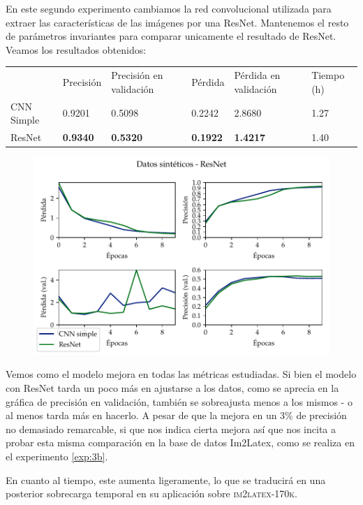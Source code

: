 \documentclass[a4paper, 20pt, dvipsnames]{article}
\begin{document}
En este segundo experimento cambiamos la red convolucional utilizada para
extraer las características de las imágenes por una ResNet. Mantenemos el resto
de parámetros invariantes para comparar unicamente el resultado de
ResNet. Veamos los resultados obtenidos:

\begin{table}[H]
	\centering
	\begin{tabular}{llllll}
		& Precisión       & Precisión en validación & Pérdida         & Pérdida en validación & Tiempo (h) \\ \cline{2-6} 
		CNN Simple & 0.9201          & 0.5098                  & 0.2242          & 2.8680                & 1.27       \\
		ResNet     & \textbf{0.9340} & \textbf{0.5320}         & \textbf{0.1922} & \textbf{1.4217}       & 1.40      
	\end{tabular}
\end{table}

\begin{figure}[H]
	\centering
	\includegraphics{fig/toy-2.pdf}
\end{figure}

Vemos como el modelo mejora en todas las métricas estudiadas. Si bien el modelo
con ResNet tarda un poco más en ajustarse a los datos, como se aprecia en la
gráfica de precisión en validación, también se sobreajusta menos a los mismos -
o al menos tarda más en hacerlo. A pesar de que la mejora en un 3\% de precisión
no demasiado remarcable, si que nos indica cierta mejora así que nos incita a
probar esta misma comparación en la base de datos Im2Latex, como se realiza en
el experimento \ref{exp:3b}.

En cuanto al tiempo, este aumenta ligeramente, lo que se traducirá en una
posterior sobrecarga temporal en su aplicación sobre \textsc{im2latex-170k}.
\end{document}
